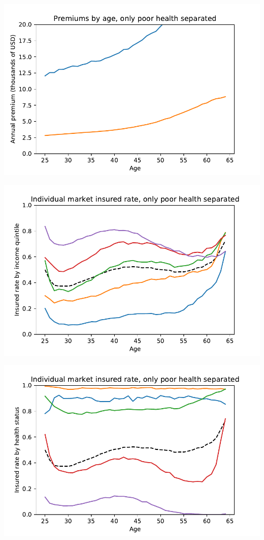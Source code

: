 \documentclass[12pt,pdftex,letterpaper]{article}
\begin{document}
\includegraphics{PremiumsPoorHealthExcluded.pdf}

\includegraphics{InsuredRateIncomePoorHealthExcluded.pdf}

\includegraphics{InsuredRateHealthPoorHealthExcluded.pdf}
\end{document}
